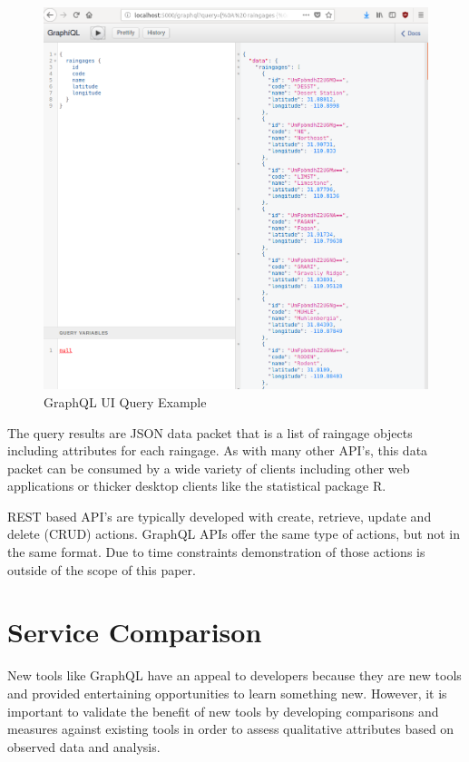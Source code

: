 \begin{figure}[htb]
  \centering\includegraphics[width=\columnwidth]
  {./images/graphql_rgs.png}
  \caption{GraphQL UI Query Example}\label{f:graphql_rgs}
\end{figure}

The query results are JSON data packet that is a list of raingage objects 
including attributes for each raingage.  As with many other API's, this data 
packet can be consumed by a wide variety of clients including other web 
applications or thicker desktop clients like the statistical package R.

REST based API's are typically developed with create, retrieve, update and 
delete (CRUD) actions.  GraphQL APIs offer the same type of actions, but not in 
the same format.  Due to time constraints demonstration of those actions is 
outside of the scope of this paper.

\section{Service Comparison}
New tools like GraphQL have an appeal to developers because they are new tools 
and provided entertaining opportunities to learn something new.  However, it 
is important to validate the benefit of new tools by developing comparisons 
and measures against existing tools in order to assess qualitative attributes 
based on observed data and analysis.


